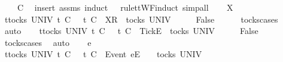 \ \ \ {\isachardoublequoteopen}{\isasymrho}{\isacharprime}\ {\isasymlesssim}\isactrlsub C\ {\isasymrho}{\isachardoublequoteclose}\isanewline
%
\isadelimproof
%
\endisadelimproof
%
\isatagproof
{}\isamarkupfalse%
\ {\isacharparenleft}insert\ assms{\isacharcomma}\ induct\ {\isachardoublequoteopen}{\isasymrho}{\isacharprime}{\isachardoublequoteclose}\ {\isachardoublequoteopen}{\isasymrho}{\isachardoublequoteclose}\ rule{\isacharcolon}ttWF{}{\isachardot}induct{\isacharcomma}\ simp{\isacharunderscore}all{\isacharparenright}\isanewline
\ \ \isamarkupfalse%
\ X\isanewline
\ \ \isamarkupfalse%
\ {\isachardoublequoteopen}{\isasymforall}t{\isasymin}tocks\ UNIV{\isachardot}\ t\ {\isasymle}\isactrlsub C\ {\isasymsigma}\ {\isasymlongrightarrow}\ t\ {\isasymle}\isactrlsub C\ {\isacharbrackleft}{\isacharbrackright}{\isachardoublequoteclose}\ {\isachardoublequoteopen}{\isacharbrackleft}{\isacharbrackleft}X{\isacharbrackright}\isactrlsub R{\isacharbrackright}\ {\isasymin}\ tocks\ UNIV{\isachardoublequoteclose}\isanewline
\ \ \isamarkupfalse%
\ \isamarkupfalse%
\ {\isachardoublequoteopen}False{\isachardoublequoteclose}\isanewline
\ \ \ \ \isamarkupfalse%
\ tocks{\isachardot}cases\ \isamarkupfalse%
\ auto\isanewline
{}\isamarkupfalse%
\isanewline
\ \ \isamarkupfalse%
\ {\isachardoublequoteopen}{\isasymforall}t{\isasymin}tocks\ UNIV{\isachardot}\ t\ {\isasymle}\isactrlsub C\ {\isasymsigma}\ {\isasymlongrightarrow}\ t\ {\isasymle}\isactrlsub C\ {\isacharbrackleft}{\isacharbrackright}{\isachardoublequoteclose}\ {\isachardoublequoteopen}{\isacharbrackleft}{\isacharbrackleft}Tick{\isacharbrackright}\isactrlsub E{\isacharbrackright}\ {\isasymin}\ tocks\ UNIV{\isachardoublequoteclose}\isanewline
\ \ \isamarkupfalse%
\ \isamarkupfalse%
\ {\isachardoublequoteopen}False{\isachardoublequoteclose}\isanewline
\ \ \ \ \isamarkupfalse%
\ tocks{\isachardot}cases\ \isamarkupfalse%
\ auto\isanewline
{}\isamarkupfalse%
\isanewline
\ \ \isamarkupfalse%
\ e\ {\isasymsigma}{\isacharprime}{\isacharprime}\isanewline
\ \ \isamarkupfalse%
\ {\isachardoublequoteopen}{\isasymforall}t{\isasymin}tocks\ UNIV{\isachardot}\ t\ {\isasymle}\isactrlsub C\ {\isasymsigma}\ {\isasymlongrightarrow}\ t\ {\isasymle}\isactrlsub C\ {\isacharbrackleft}{\isacharbrackright}{\isachardoublequoteclose}\ {\isachardoublequoteopen}{\isacharbrackleft}Event\ e{\isacharbrackright}\isactrlsub E\ {\isacharhash}\ {\isasymsigma}{\isacharprime}{\isacharprime}\ {\isasymin}\ tocks\ UNIV{\isachardoublequoteclose}\isanewline
